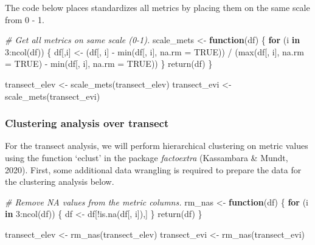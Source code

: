 \documentclass[
]{article}
\newenvironment{Shaded}{\begin{snugshade}}{\end{snugshade}}
\newcommand{\AttributeTok}[1]{\textcolor[rgb]{0.77,0.63,0.00}{#1}}
\newcommand{\CommentTok}[1]{\textcolor[rgb]{0.56,0.35,0.01}{\textit{#1}}}
\newcommand{\ConstantTok}[1]{\textcolor[rgb]{0.00,0.00,0.00}{#1}}
\newcommand{\ControlFlowTok}[1]{\textcolor[rgb]{0.13,0.29,0.53}{\textbf{#1}}}
\newcommand{\DecValTok}[1]{\textcolor[rgb]{0.00,0.00,0.81}{#1}}
\newcommand{\FunctionTok}[1]{\textcolor[rgb]{0.00,0.00,0.00}{#1}}
\newcommand{\NormalTok}[1]{#1}
\newcommand{\OtherTok}[1]{\textcolor[rgb]{0.56,0.35,0.01}{#1}}
\newcommand{\SpecialCharTok}[1]{\textcolor[rgb]{0.00,0.00,0.00}{#1}}
\begin{document}
The code below places standardizes all metrics by placing them on the
same scale from 0 - 1.

\begin{Shaded}
\begin{Highlighting}[]
\CommentTok{\# Get all metrics on same scale (0{-}1).}
\NormalTok{scale\_mets }\OtherTok{\textless{}{-}} \ControlFlowTok{function}\NormalTok{(df) \{}
  \ControlFlowTok{for}\NormalTok{ (i }\ControlFlowTok{in} \DecValTok{3}\SpecialCharTok{:}\FunctionTok{ncol}\NormalTok{(df)) \{}
\NormalTok{     df[,i] }\OtherTok{\textless{}{-}}\NormalTok{ (df[, i] }\SpecialCharTok{{-}} \FunctionTok{min}\NormalTok{(df[, i], }\AttributeTok{na.rm =} \ConstantTok{TRUE}\NormalTok{)) }\SpecialCharTok{/} 
\NormalTok{       (}\FunctionTok{max}\NormalTok{(df[, i], }\AttributeTok{na.rm =} \ConstantTok{TRUE}\NormalTok{) }\SpecialCharTok{{-}} \FunctionTok{min}\NormalTok{(df[, i], }\AttributeTok{na.rm =} \ConstantTok{TRUE}\NormalTok{))}
\NormalTok{  \}}
  \FunctionTok{return}\NormalTok{(df)}
\NormalTok{\}}

\NormalTok{transect\_elev }\OtherTok{\textless{}{-}} \FunctionTok{scale\_mets}\NormalTok{(transect\_elev)}
\NormalTok{transect\_evi }\OtherTok{\textless{}{-}} \FunctionTok{scale\_mets}\NormalTok{(transect\_evi)}
\end{Highlighting}
\end{Shaded}

\hypertarget{clustering-analysis-over-transect}{%
\subsubsection{Clustering analysis over
transect}\label{clustering-analysis-over-transect}}

For the transect analysis, we will perform hierarchical clustering on
metric values using the function `eclust' in the package
\emph{factoextra} (Kassambara \& Mundt, 2020). First, some additional
data wrangling is required to prepare the data for the clustering
analysis below.

\begin{Shaded}
\begin{Highlighting}[]

\CommentTok{\# Remove NA values from the metric columns.}
\NormalTok{rm\_nas }\OtherTok{\textless{}{-}} \ControlFlowTok{function}\NormalTok{(df) \{}
  \ControlFlowTok{for}\NormalTok{ (i }\ControlFlowTok{in} \DecValTok{3}\SpecialCharTok{:}\FunctionTok{ncol}\NormalTok{(df)) \{}
\NormalTok{    df }\OtherTok{\textless{}{-}}\NormalTok{ df[}\SpecialCharTok{!}\FunctionTok{is.na}\NormalTok{(df[, i]),]}
\NormalTok{  \}}
  \FunctionTok{return}\NormalTok{(df)}
\NormalTok{\}}

\NormalTok{transect\_elev }\OtherTok{\textless{}{-}} \FunctionTok{rm\_nas}\NormalTok{(transect\_elev)}
\NormalTok{transect\_evi }\OtherTok{\textless{}{-}} \FunctionTok{rm\_nas}\NormalTok{(transect\_evi)}
\end{Highlighting}
\end{Shaded}
\end{document}
